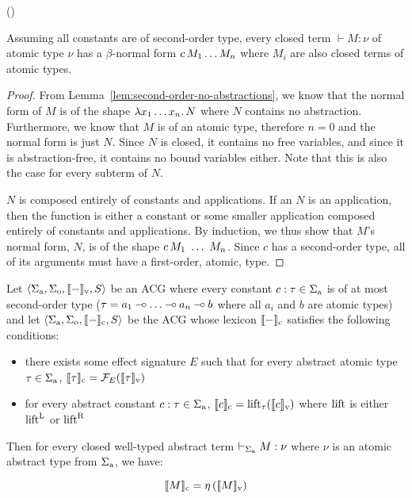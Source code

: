 \begin{corollary}\label{cor:second-order-trees}
  ()
  
  Assuming all constants are of second-order type, every closed term
  $\vdash M : \nu$ of atomic type $\nu$ has a $\beta$-normal form
  $c\,M_1 \ldots M_n$ where $M_i$ are also closed terms of atomic
  types.
\end{corollary}

\begin{proof}
  From Lemma~\ref{lem:second-order-no-abstractions}, we know that the
  normal form of $M$ is of the shape $\lambda x_1 \ldots x_n.\, N$ where $N$
  contains no abstraction. Furthermore, we know that $M$ is of an atomic
  type, therefore $n = 0$ and the normal form is just $N$. Since $N$ is
  closed, it contains no free variables, and since it is abstraction-free,
  it contains no bound variables either. Note that this is also the case
  for every subterm of $N$.
  
  $N$ is composed entirely of constants and applications. If an $N$ is an
  application, then the function is either a constant or some smaller
  application composed entirely of constants and applications. By
  induction, we thus show that $M$'s normal form, $N$, is of the shape
  $\ap{c}{M_1\ \ldots\ M_n}$. Since $c$ has a second-order type, all of its
  arguments must have a first-order, atomic, type.
\end{proof}

\begin{observation}
  Let $\left< \Sigma_{\mathrm{a}}, \Sigma_{\mathrm{o}}, \llbracket - \rrbracket_{\mathrm{v}}, S \right>$
  be an ACG where every constant $c : \tau \in \Sigma_{\mathrm{a}}$ is of at
  most second-order type ($\tau = a_1 \mathbin{{-}\mkern-3.5mu{\circ}} \ldots \mathbin{{-}\mkern-3.5mu{\circ}} a_n \mathbin{{-}\mkern-3.5mu{\circ}} b$ where
  all $a_i$ and $b$ are atomic types) and let
  $\left< \Sigma_{\mathrm{a}}, \Sigma_{\mathrm{o}}, \llbracket - \rrbracket_{\mathrm{c}}, S \right>$ be
  the ACG whose lexicon $\llbracket - \rrbracket_{\mathrm{c}}$ satisfies the following
  conditions:

  \begin{itemize}
  \item there exists some effect signature $E$ such that for every abstract
    atomic type $\tau \in \Sigma_{\mathrm{a}}$,
    $\llbracket \tau \rrbracket_{\mathrm{c}} = \mathcal{F}_E(\llbracket \tau \rrbracket_{\mathrm{v}})$
  \item for every abstract constant $c : \tau \in \Sigma_{\mathrm{a}}$,
    $\llbracket c \rrbracket_{\mathrm{c}} = \operatorname{lift}_\tau(\llbracket c \rrbracket_{\mathrm{v}})$ where $\operatorname{lift}$ is either
    $\operatorname{lift}^{\mathrm{L}}$ or $\operatorname{lift}^{\mathrm{R}}$
  \end{itemize}
  
  Then for every closed well-typed abstract term
  $\vdash_{\Sigma_{\mathrm{a}}} M : \nu$ where $\nu$ is an atomic abstract type
  from $\Sigma_{\mathrm{a}}$, we have:

  $$
  \llbracket M \rrbracket_{\mathrm{c}} = \eta\,(\llbracket M \rrbracket_{\mathrm{v}})
  $$
\end{observation}

